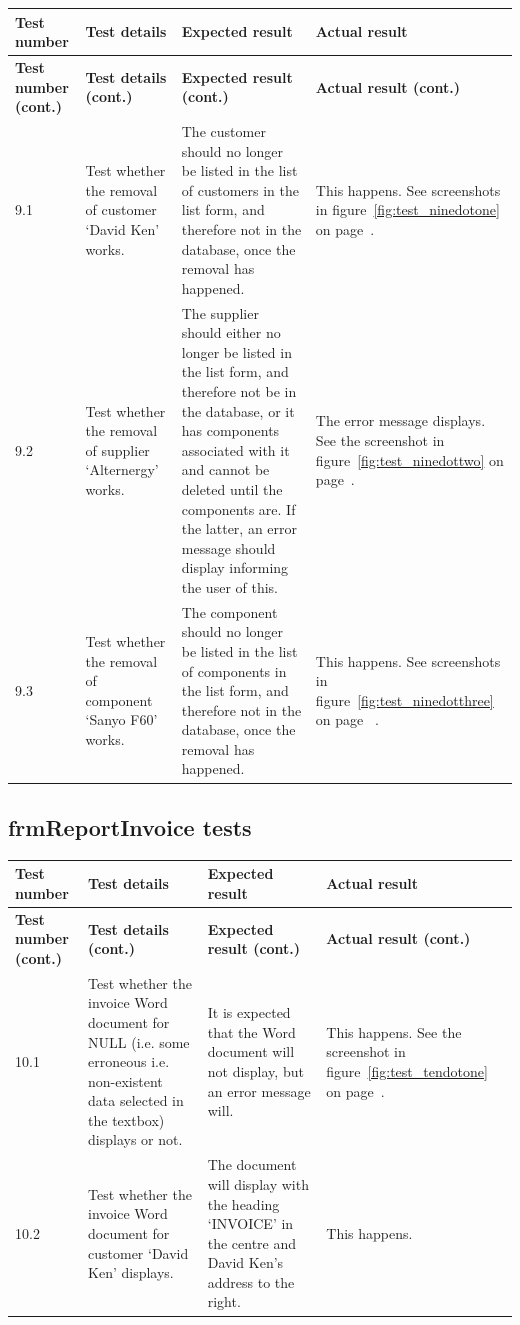 \begin{longtable}{ | p{2cm} | p{4cm} | p{4cm} | p{4cm} | }
	\hline
	\textbf{Test number} & \textbf{Test details} & \textbf{Expected result} & \textbf{Actual result}\\
	\endfirsthead
	\hline
	\textbf{Test number (cont.)} & \textbf{Test details (cont.)} & \textbf{Expected result (cont.)} & \textbf{Actual result (cont.)}\\
	\endhead
	\hline
	9.1 & Test whether the removal of customer `David Ken' works. & The customer should no longer be listed in the list of customers in the list form, and therefore not in the database, once the removal has happened. & This happens.  See screenshots in figure~\ref{fig:test_ninedotone} on page~\pageref{fig:test_ninedotone}.\\
	\hline
	9.2 & Test whether the removal of supplier `Alternergy' works. & The supplier should either no longer be listed in the list form, and therefore not be in the database, or it has components associated with it and cannot be deleted until the components are.  If the latter, an error message should display informing the user of this. & The error message displays.  See the screenshot in figure~\ref{fig:test_ninedottwo} on page~\pageref{fig:test_ninedottwo}.\\
	\hline
	9.3 & Test whether the removal of component `Sanyo F60' works. & The component should no longer be listed in the list of components in the list form, and therefore not in the database, once the removal has happened. & This happens.  See screenshots in figure~\ref{fig:test_ninedotthree} on page ~\pageref{fig:test_ninedotthree}.\\
	\hline
\end{longtable}

\subsection{frmReportInvoice tests}

\begin{longtable}{ | p{2cm} | p{4cm} | p{4cm} | p{4cm} | }
	\hline
	\textbf{Test number} & \textbf{Test details} & \textbf{Expected result} & \textbf{Actual result}\\
	\endfirsthead
	\hline
	\textbf{Test number (cont.)} & \textbf{Test details (cont.)} & \textbf{Expected result (cont.)} & \textbf{Actual result (cont.)}\\
	\endhead
	\hline
	10.1 & Test whether the invoice Word document for NULL (i.e. some erroneous i.e. non-existent data selected in the textbox) displays or not. & It is expected that the Word document will not display, but an error message will.  & This happens.  See the screenshot in figure~\ref{fig:test_tendotone} on page~\pageref{fig:test_tendotone}.\\
	\hline
	10.2 & Test whether the invoice Word document for customer `David Ken' displays. & The document will display with the heading `INVOICE' in the centre and David Ken's address to the right. & This happens.\\
	\hline
\end{longtable}

